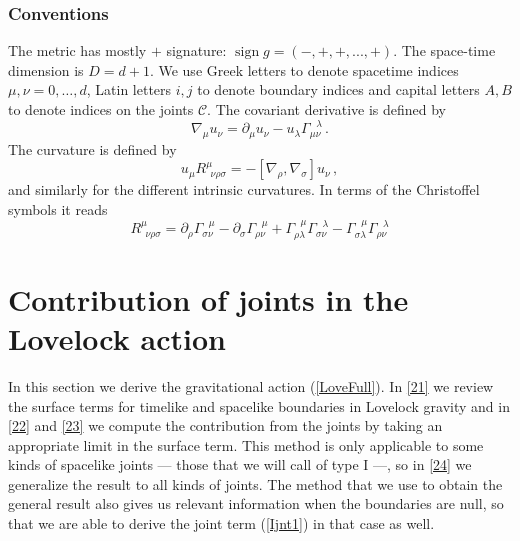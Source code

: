 \documentclass[11pt,letterpaper]{article}
\begin{document}
\subsubsection*{Conventions}
The metric has mostly $+$ signature: $\operatorname{sign}{g}=(-,+,+,...,+)$. The space-time dimension is $D=d+1$.  We use Greek letters to denote spacetime indices $\mu, \nu=0, \ldots, d$, Latin letters $i, j$  to denote boundary indices and capital letters $A, B$ to denote indices on the joints $\mathcal{C}$.
The covariant derivative is defined by
\begin{equation}
\nabla_{\mu}u_{\nu}=\partial_{\mu}u_{\nu}-u_{\lambda}\Gamma^{\ \ \ \lambda}_{\mu\nu}\, .
\end{equation}
The curvature is defined by
\begin{equation}
u_{\mu}R^{\mu}_{\ \ \nu\rho\sigma}=-\left[\nabla_{\rho},\nabla_{\sigma}\right] u_{\nu}\, ,
\end{equation}
and similarly for the different intrinsic curvatures. In terms of the Christoffel symbols it reads
\begin{equation}
R^{\mu}_{\ \ \nu\rho\sigma}=\partial_{\rho}\Gamma_{\sigma\nu}^{\ \ \ \mu}-\partial_{\sigma}\Gamma_{\rho\nu}^{\ \ \ \mu}+\Gamma_{\rho\lambda}^{\ \ \ \mu}\Gamma_{\sigma\nu}^{\ \ \ \lambda}-\Gamma_{\sigma\lambda}^{\ \ \ \mu}\Gamma_{\rho\nu}^{\ \ \ \lambda}
\end{equation}


\section{Contribution of joints in the Lovelock action}\label{2}
In this section we derive the gravitational action (\ref{LoveFull}). In \ref{21} we review the surface terms for timelike and spacelike boundaries in Lovelock gravity and in \ref{22} and \ref{23} we compute the contribution from the joints by taking an appropriate limit in the surface term. This method is only applicable to some kinds of spacelike joints --- those that we will call of type I ---, so in \ref{24} we generalize the result to all kinds of joints. The method that we use to obtain the general result also gives us relevant information when the boundaries are null, so that we are able to derive the joint term (\ref{Ijnt1}) in that case as well.
\end{document}
